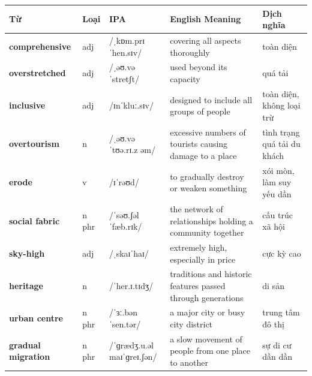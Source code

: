 \vspace{0.8em}
\begin{center}
\renewcommand{\arraystretch}{1.65}
\begin{tabularx}{\textwidth}{|V{0.22\textwidth}|C{0.07\textwidth}|I{0.20\textwidth}|Y|V{0.18\textwidth}|}
\hline
{}
\textbf{Từ} & \textbf{Loại} & \textbf{IPA} & \textbf{English Meaning} & \textbf{Dịch nghĩa} \\
\hline
\textbf{comprehensive} & adj & /ˌkɒm.prɪˈhen.sɪv/ & covering all aspects thoroughly & toàn diện \\ \hline
\textbf{overstretched} & adj & /ˌəʊ.vəˈstretʃt/ & used beyond its capacity & quá tải \\ \hline
\textbf{inclusive} & adj & /ɪnˈkluː.sɪv/ & designed to include all groups of people & toàn diện, không loại trừ \\ \hline
\textbf{overtourism} & n & /ˌəʊ.vəˈtʊə.rɪ.z əm/ & excessive numbers of tourists causing damage to a place & tình trạng quá tải du khách \\ \hline
\textbf{erode} & v & /ɪˈrəʊd/ & to gradually destroy or weaken something & xói mòn, làm suy yếu dần \\ \hline
\textbf{social fabric} & n phr & /ˈsəʊ.ʃəl ˈfæb.rɪk/ & the network of relationships holding a community together & cấu trúc xã hội \\ \hline
\textbf{sky-high} & adj & /ˌskaɪˈhaɪ/ & extremely high, especially in price & cực kỳ cao \\ \hline
\textbf{heritage} & n & /ˈher.ɪ.tɪdʒ/ & traditions and historic features passed through generations & di sản \\ \hline
\textbf{urban centre} & n phr & /ˈɜː.bən ˈsen.tər/ & a major city or busy city district & trung tâm đô thị \\ \hline
\textbf{gradual migration} & n phr & /ˈɡrædʒ.u.əl maɪˈɡreɪ.ʃən/ & a slow movement of people from one place to another & sự di cư dần dần \\ \hline
\end{tabularx}
\end{center}

\newpage

